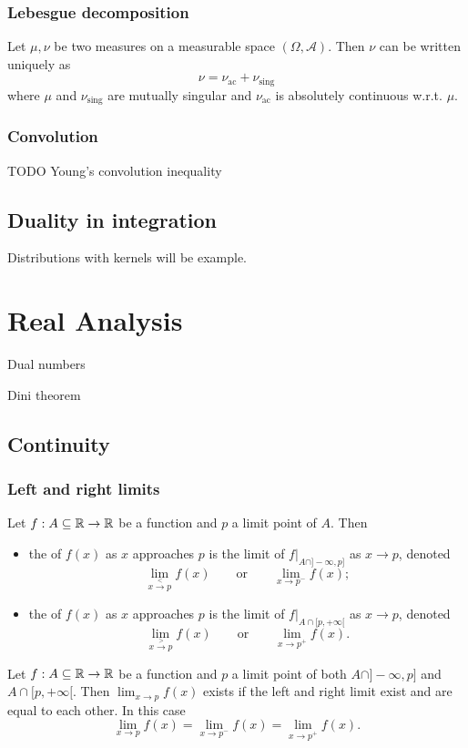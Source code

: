 \subsection{Lebesgue decomposition}
\begin{theorem}
Let $\mu, \nu$ be two measures on a measurable space $(\Omega, \mathcal{A})$. Then $\nu$ can be written uniquely as
\[ \nu = \nu_\text{ac} + \nu_\text{sing} \]
where $\mu$ and $\nu_\text{sing}$ are mutually singular and $\nu_\text{ac}$ is absolutely continuous w.r.t. $\mu$. 

\end{theorem}

\subsection{Convolution}
TODO Young's convolution inequality

\section{Duality in integration}
Distributions with kernels will be example.

\chapter{Real Analysis}
Dual numbers

Dini theorem

\section{Continuity}

\subsection{Left and right limits}
\begin{definition}
Let $f:A\subseteq\mathbb{R}\to\mathbb{R}$ be a function and $p$ a limit point of $A$. Then
\begin{itemize}
\item the  of $f(x)$ as $x$ approaches $p$ is the limit of $f|_{A\cap]-\infty,p]}$ as $x\to p$, denoted
\[ \lim_{x\overset{<}{\to} p}f(x) \qquad \text{or} \qquad \lim_{x\to p^-}f(x); \]
\item the  of $f(x)$ as $x$ approaches $p$ is the limit of $f|_{A\cap[p,+\infty[}$ as $x\to p$, denoted
\[ \lim_{x\overset{>}{\to} p}f(x) \qquad \text{or} \qquad \lim_{x\to p^+}f(x). \]
\end{itemize}
\end{definition}
\begin{lemma}
Let $f:A\subseteq\mathbb{R}\to\mathbb{R}$ be a function and $p$ a limit point of both $A\cap]-\infty,p]$ and $A\cap[p,+\infty[$. Then $\lim_{x\to p} f(x)$ exists if the left and right limit exist and are equal to each other. In this case
\[ \lim_{x\to p} f(x) = \lim_{x\to p^-} f(x) = \lim_{x\to p^+} f(x). \]
\end{lemma}

